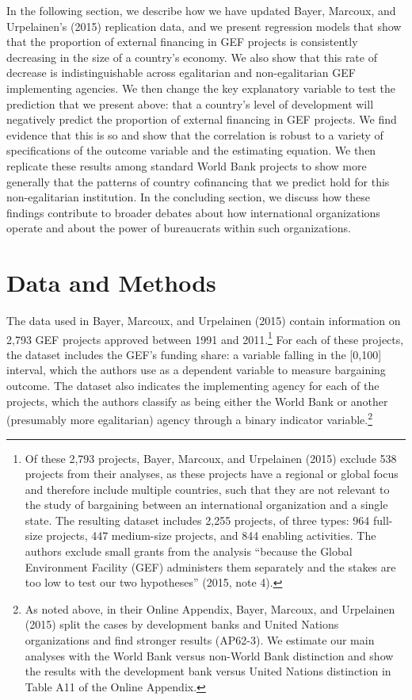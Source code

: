 \documentclass{article}
\begin{document}
In the following section, we describe how we have updated Bayer, Marcoux, and Urpelainen’s (2015) replication data, and we present regression models that show that the proportion of external financing in GEF projects is consistently decreasing in the size of a country’s economy.  We also show that this rate of decrease is indistinguishable across egalitarian and non-egalitarian GEF implementing agencies.  We then change the key explanatory variable to test the prediction that we present above: that a country’s level of development will negatively predict the proportion of external financing in GEF projects.  We find evidence that this is so and show that the correlation is robust to a variety of specifications of the outcome variable and the estimating equation.  We then replicate these results among standard World Bank projects to show more generally that the patterns of country cofinancing that we predict hold for this non-egalitarian institution.  In the concluding section, we discuss how these findings contribute to broader debates about how international organizations operate and about the power of bureaucrats within such organizations.

\section{Data and Methods}
The data used in Bayer, Marcoux, and Urpelainen (2015) contain information on 2,793 GEF projects approved between 1991 and 2011.\footnote{Of these 2,793 projects, Bayer, Marcoux, and Urpelainen (2015) exclude 538 projects from their analyses, as these projects have a regional or global focus and therefore include multiple countries, such that they are not relevant to the study of bargaining between an international organization and a single state. The resulting dataset includes 2,255 projects, of three types: 964 full-size projects, 447 medium-size projects, and 844 enabling activities. The authors exclude small grants from the analysis “because the Global Environment Facility (GEF) administers them separately and the stakes are too low to test our two hypotheses” (2015, note 4).}   For each of these projects, the dataset includes the GEF’s funding share: a variable falling in the [0,100] interval, which the authors use as a dependent variable to measure bargaining outcome.  The dataset also indicates the implementing agency for each of the projects, which the authors classify as being either the World Bank or another (presumably more egalitarian) agency through a binary indicator variable.\footnote{As noted above, in their Online Appendix, Bayer, Marcoux, and Urpelainen (2015) split the cases by development banks and United Nations organizations and find stronger results (AP62-3).  We estimate our main analyses with the World Bank versus non-World Bank distinction and show the results with the development bank versus United Nations distinction in Table A11 of the Online Appendix.}
   
\end{document}

